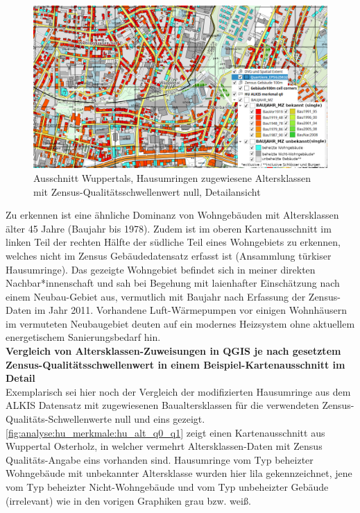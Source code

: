 		\begin{figure}[h]
			\centering
			\includegraphics[width=\linewidth]{./Medien/own/hu_merk/qgis_hu_alt_q0_wuppertal_ausschnitt_medium_cells.png}
			\caption{Ausschnitt Wuppertals, Hausumringen zugewiesene Altersklassen mit Zensus-Qualitätsschwellenwert null, Detailansicht}
			\label{fig:analyse:hu_merkmale:hu_alt_q0_medium}
		\end{figure}
	
		Zu erkennen ist eine ähnliche Dominanz von Wohngebäuden mit Altersklassen älter 45 Jahre (Baujahr bis 1978). Zudem ist im oberen Kartenausschnitt im linken Teil der rechten Hälfte der südliche Teil eines Wohngebiets zu erkennen, welches nicht im Zensus Gebäudedatensatz erfasst ist (Ansammlung türkiser Hausumringe). Das gezeigte Wohngebiet befindet sich in meiner direkten Nachbar*innenschaft und sah bei Begehung mit laienhafter Einschätzung nach einem Neubau-Gebiet aus, vermutlich mit Baujahr nach Erfassung der Zensus-Daten im Jahr 2011. Vorhandene Luft-Wärmepumpen vor einigen Wohnhäusern im vermuteten Neubaugebiet deuten auf ein modernes Heizsystem ohne aktuellem energetischem Sanierungsbedarf hin. \\
		
		\textbf{Vergleich von Altersklassen-Zuweisungen in QGIS je nach gesetztem Zensus-Qualitätsschwellenwert in einem Beispiel-Kartenausschnitt im Detail}\\
		Exemplarisch sei hier noch der Vergleich der modifizierten Hausumringe aus dem ALKIS Datensatz mit zugewiesenen Baualtersklassen für die verwendeten Zensus-Qualitäts-Schwellenwerte null und eins gezeigt. \autoref{fig:analyse:hu_merkmale:hu_alt_q0_q1} zeigt einen Kartenausschnitt aus Wuppertal Osterholz, in welcher vermehrt Altersklassen-Daten mit Zensus Qualitäts-Angabe eins vorhanden sind. Hausumringe vom Typ beheizter Wohngebäude mit unbekannter Altersklasse wurden hier lila gekennzeichnet, jene vom Typ beheizter Nicht-Wohngebäude und vom Typ unbeheizter Gebäude (irrelevant) wie in den vorigen Graphiken grau bzw. weiß. 
		
